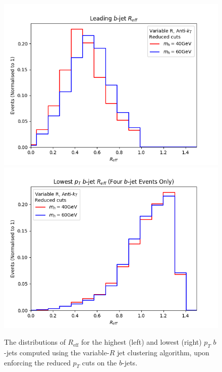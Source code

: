 \documentclass[12pt]{article}
\begin{document}
\begin{figure}[htb!]
	\includegraphics[scale=0.5]{plots/Reff_bjet1.png}
	\includegraphics[scale=0.5]{plots/Reff_bjet4.png}
	\caption{The distributions of $R_{\text{eff}}$ for the highest (left) and lowest (right) $p_T$
$b$-jets computed using the variable-$R$ jet clustering algorithm, upon enforcing the reduced $p_T$ cuts on the $b$-jets.}
\label{fig:Reff_bjet}
\end{figure}
\end{document}
